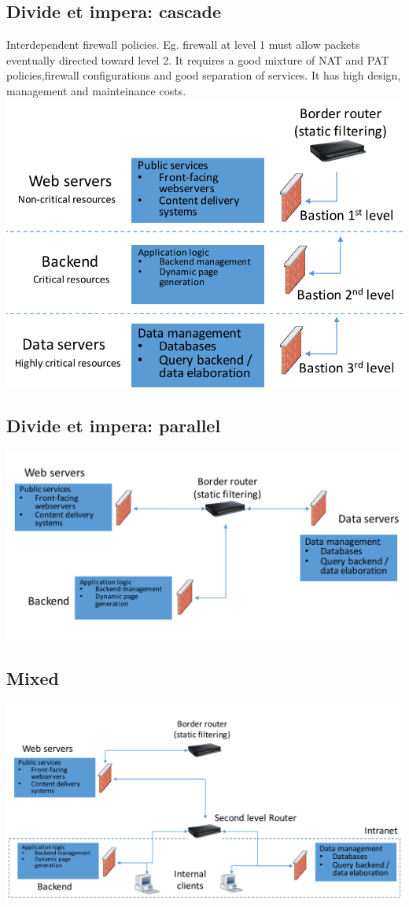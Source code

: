 \documentclass[10pt,a4paper]{book}
\begin{document}
\subsection{Divide et impera: cascade}
Interdependent firewall policies. Eg. firewall at level 1 must allow packets eventually directed toward level 2. It requires a good mixture of NAT and PAT policies,firewall configurations and good separation of services. It has high design, management and mainteinance costs.
\includegraphics[scale=0.3]{firewall/cascade.png}
\subsection{Divide et impera: parallel}
\includegraphics[scale=0.3]{firewall/parallel.png}
\subsection{Mixed}
\includegraphics[scale=0.3]{firewall/mixed.png}
\end{document}

